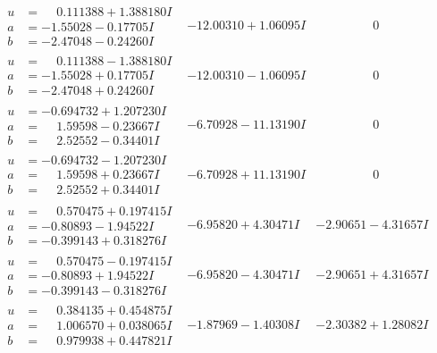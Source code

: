 \documentclass[1p]{elsarticle_modified}
\theoremstyle{definition}
\begin{document}
$$\begin{array}{c|c|c}
\begin{aligned}
u &= \phantom{-}0.111388 + 1.388180 I \\
a &= -1.55028 - 0.17705 I \\
b &= -2.47048 - 0.24260 I\end{aligned}
 & -12.00310 + 1.06095 I & \phantom{-0.000000 } 0 \\ \hline\begin{aligned}
u &= \phantom{-}0.111388 - 1.388180 I \\
a &= -1.55028 + 0.17705 I \\
b &= -2.47048 + 0.24260 I\end{aligned}
 & -12.00310 - 1.06095 I & \phantom{-0.000000 } 0 \\ \hline\begin{aligned}
u &= -0.694732 + 1.207230 I \\
a &= \phantom{-}1.59598 - 0.23667 I \\
b &= \phantom{-}2.52552 - 0.34401 I\end{aligned}
 & -6.70928 - 11.13190 I & \phantom{-0.000000 } 0 \\ \hline\begin{aligned}
u &= -0.694732 - 1.207230 I \\
a &= \phantom{-}1.59598 + 0.23667 I \\
b &= \phantom{-}2.52552 + 0.34401 I\end{aligned}
 & -6.70928 + 11.13190 I & \phantom{-0.000000 } 0 \\ \hline\begin{aligned}
u &= \phantom{-}0.570475 + 0.197415 I \\
a &= -0.80893 - 1.94522 I \\
b &= -0.399143 + 0.318276 I\end{aligned}
 & -6.95820 + 4.30471 I & -2.90651 - 4.31657 I \\ \hline\begin{aligned}
u &= \phantom{-}0.570475 - 0.197415 I \\
a &= -0.80893 + 1.94522 I \\
b &= -0.399143 - 0.318276 I\end{aligned}
 & -6.95820 - 4.30471 I & -2.90651 + 4.31657 I \\ \hline\begin{aligned}
u &= \phantom{-}0.384135 + 0.454875 I \\
a &= \phantom{-}1.006570 + 0.038065 I \\
b &= \phantom{-}0.979938 + 0.447821 I\end{aligned}
 & -1.87969 - 1.40308 I & -2.30382 + 1.28082 I \\ \hline\begin{aligned}

\end{aligned}
\end{array}$$
\end{document}
